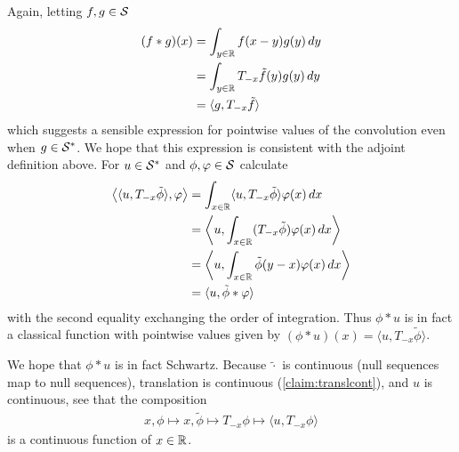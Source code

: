     Again, letting $f,g\in\S$
    \begin{align*}
      (f*g)(x)
      &= \int_{y\in\R} f(x-y)g(y)\,dy
      \\&= \int_{y\in\R} T_{-x}\tilde f(y) g(y)\, dy
      \\&= \langle g, T_{-x}\tilde f\rangle
    \end{align*}
    which suggests a sensible expression for pointwise values of the convolution even when $g\in\SS$.
    We hope that this expression is consistent with the adjoint definition above.
    For $u\in\SS$ and $\phi,\varphi\in\S$ calculate
    \begin{align*}
      \left\langle \langle u,T_{-x}\tilde\phi\rangle, \varphi \right\rangle
      &= \int_{x\in\R} \langle u,T_{-x}\tilde\phi\rangle\varphi(x)\,dx
      \\&= \left\langle u, \int_{x\in\R} (T_{-x}\tilde\phi)\varphi(x)\,dx \right\rangle
      \\&= \left\langle u, \int_{x\in\R} \tilde\phi(y-x)\varphi(x)\,dx \right\rangle
      \\&= \langle u, \tilde\phi*\varphi\rangle
    \end{align*}
    with the second equality exchanging the order of integration.
    Thus $\phi*u$ is in fact a classical function with pointwise values given by $(\phi*u)(x)=\langle u, T_{-x}\tilde\phi\rangle$.

    We hope that $\phi*u$ is in fact Schwartz.
    Because $\tilde\cdot$ is continuous (null sequences map to null sequences), translation is continuous (\cref{claim:translcont}), and $u$ is continuous, see that the composition
    \begin{align*}
      x, \phi \mapsto x, \tilde\phi \mapsto T_{-x}\phi \mapsto \langle u, T_{-x}\phi \rangle
    \end{align*}
    is a continuous function of $x\in\R$.

%      

